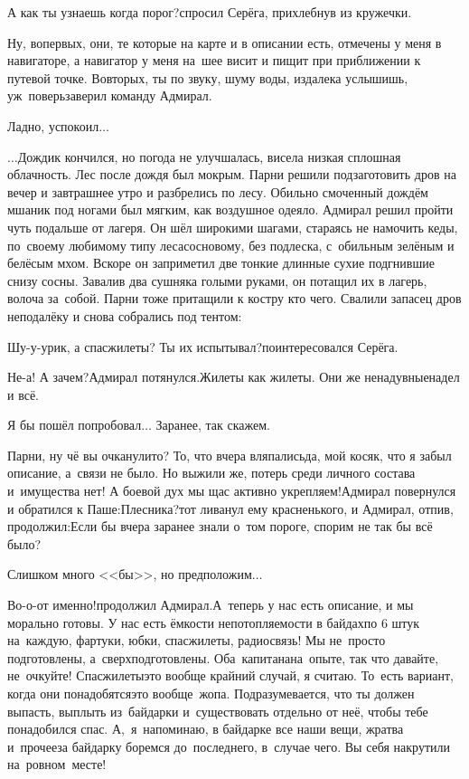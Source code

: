 \diagdash А как ты узнаешь когда порог?\mdash спросил Серёга, прихлебнув из кружечки.

\diagdash Ну, во\sdash первых, они, те которые на карте и в описании есть, отмечены у меня в навигаторе, а навигатор у меня на~шее висит и пищит при приближении к путевой точке. Во\sdash вторых, ты по звуку, шуму воды, издалека услышишь, уж~поверь\mdash заверил команду Адмирал.

\diagdash Ладно, успокоил$\ldots$

\vspace{0.5cm}
$\ldots$Дождик кончился, но погода не улучшалась, висела низкая сплошная облачность. Лес после дождя был мокрым. Парни решили подзаготовить дров на вечер и завтрашнее утро и разбрелись по лесу. Обильно смоченный дождём мшаник под ногами был мягким, как воздушное одеяло. Адмирал решил пройти чуть подальше от лагеря. Он шёл широкими шагами, стараясь не намочить кеды, по~своему любимому типу леса\mdash сосновому, без подлеска, с~обильным зелёным и белёсым мхом. Вскоре он заприметил две тонкие длинные сухие подгнившие снизу сосны. Завалив два сушняка голыми руками, он потащил их в лагерь, волоча за~собой. Парни тоже притащили к костру кто чего. Свалили запасец дров неподалёку и снова собрались под тентом:

\diagdash Шу-у-урик, а спасжилеты? Ты их испытывал?\mdash поинтересовался Серёга.

\diagdash Не-а! А зачем?\mdash Адмирал потянулся.\mdash Жилеты как жилеты. Они же ненадувные\mdash надел и всё.

\diagdash Я бы пошёл попробовал$\ldots$ Заранее, так скажем.

\diagdash Парни, ну чё вы очканули\sdash то? То, что вчера вляпались\mdash да, мой косяк, что я забыл описание, а~связи не было. Но выжили же, потерь среди личного состава и~имущества нет! А боевой дух мы щас активно укрепляем!\mdash Адмирал повернулся и обратился к Паше:\mdash Плесни\sdash ка?\mdash тот ливанул ему красненького, и Адмирал, отпив, продолжил:\mdash Если бы вчера заранее знали о~том пороге, спорим не так бы всё было?

\diagdash Слишком много <<бы>>, но предположим$\ldots$

\diagdash Во-о-от именно!\mdash продолжил Адмирал.\mdash А~теперь у нас есть описание, и мы морально готовы. У нас есть ёмкости непотопляемости в байдах\mdash по 6 штук на~каждую, фартуки, юбки, спасжилеты, радиосвязь! Мы не~просто подготовлены, а~сверхподготовлены. Оба~капитана\mdash на~опыте, так что давайте, не~очкуйте! Спасжилеты\mdash это вообще крайний случай, я считаю. То~есть вариант, когда они понадобятся\mdash это вообще~жопа. Подразумевается, что ты должен выпасть, выплыть из~байдарки и~существовать отдельно от неё, чтобы тебе понадобился спас. А,~я~напоминаю, в байдарке все наши вещи, жратва и~прочее\mdash за байдарку боремся до~последнего, в~случае чего. Вы себя накрутили на~ровном~месте!

